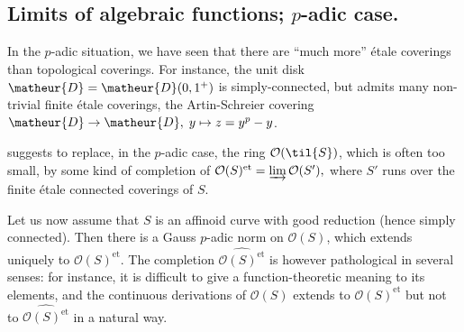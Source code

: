 \subsection{Limits of algebraic functions; $p$-adic case.}
\label{subsection-remedy}
\begin{para}
 In the $p$-adic situation, we have seen that there are ``much more''
 \'etale coverings than topological coverings. For instance, the unit disk
 $\matheur{D}=\matheur{D}(0,1^+)$ is simply-connected, but admits many
 non-trivial finite \'etale coverings, \eg the Artin-Schreier covering
 $\matheur{D}\rightarrow \matheur{D}, \;y\mapsto z=y^p-y$.
 
 suggests to replace, in the $p$-adic case, the ring 
 $\mathcal{O}(\til{S})$, which is often too
 small, by some kind of completion of $\mathcal{O}(S)^{\mathrm{et}}= \varinjlim
 \mathcal{O}(S'),$ where $S'$ runs over the finite \'etale
 connected coverings of $S$.
 
 Let us now assume that $S$ is an affinoid curve with good 
 reduction (hence simply connected). Then there is a
 Gauss $p$-adic norm on $\mathcal{O}(S)$, which extends uniquely to 
 $\mathcal{O}(S)^{\mathrm{et}}$.
 The completion $\widehat{\mathcal{O}(S)^{\mathrm{et}}}$ is
 however pathological in several senses: for instance, 
 it is difficult to give a function-theoretic 
 meaning to its elements, and the continuous derivations of
 $\mathcal{O}(S)$ extends to $\mathcal{O}(S)^{\mathrm{et}}$ but not to
 $\widehat{\mathcal{O}(S)^{\mathrm{et}}}$ in a natural way.
\end{para}

